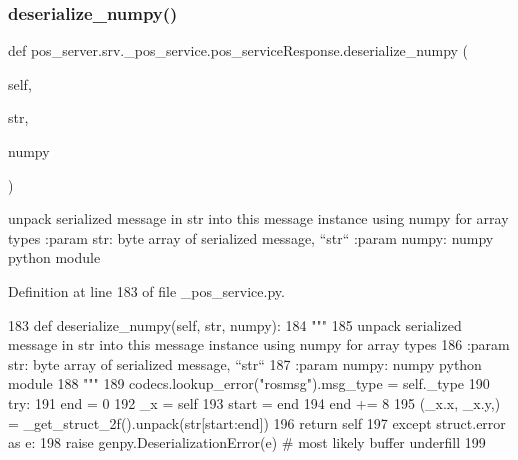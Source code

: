 \subsubsection{\texorpdfstring{deserialize\+\_\+numpy()}{deserialize\_numpy()}}
{\footnotesize\ttfamily def pos\+\_\+server.\+srv.\+\_\+pos\+\_\+service.\+pos\+\_\+service\+Response.\+deserialize\+\_\+numpy (\begin{DoxyParamCaption}\item[{}]{self,  }\item[{}]{str,  }\item[{}]{numpy }\end{DoxyParamCaption})}

\begin{DoxyVerb}unpack serialized message in str into this message instance using numpy for array types
:param str: byte array of serialized message, ``str``
:param numpy: numpy python module
\end{DoxyVerb}
 

Definition at line 183 of file \+\_\+pos\+\_\+service.\+py.


\begin{DoxyCode}
183   \textcolor{keyword}{def }deserialize\_numpy(self, str, numpy):
184     \textcolor{stringliteral}{"""}
185 \textcolor{stringliteral}{    unpack serialized message in str into this message instance using numpy for array types}
186 \textcolor{stringliteral}{    :param str: byte array of serialized message, ``str``}
187 \textcolor{stringliteral}{    :param numpy: numpy python module}
188 \textcolor{stringliteral}{    """}
189     codecs.lookup\_error(\textcolor{stringliteral}{"rosmsg"}).msg\_type = self.\_type
190     \textcolor{keywordflow}{try}:
191       end = 0
192       \_x = self
193       start = end
194       end += 8
195       (\_x.x, \_x.y,) = \_get\_struct\_2f().unpack(str[start:end])
196       \textcolor{keywordflow}{return} self
197     \textcolor{keywordflow}{except} struct.error \textcolor{keyword}{as} e:
198       \textcolor{keywordflow}{raise} genpy.DeserializationError(e)  \textcolor{comment}{# most likely buffer underfill}
199 
\end{DoxyCode}
\mbox{\label{classpos__server_1_1srv_1_1__pos__service_1_1pos__serviceResponse_a0e8e23b6c3e7cae84817c64f16a0a34b}} 
